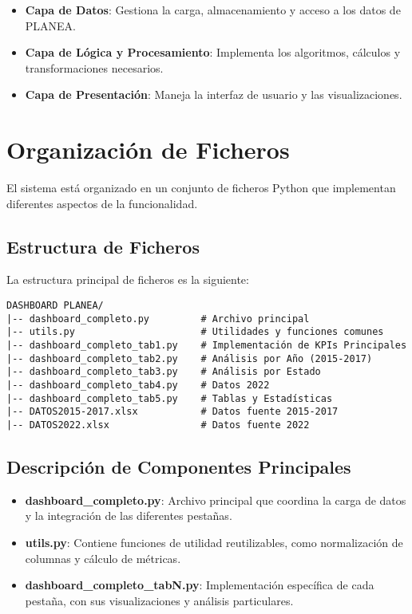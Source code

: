 \begin{itemize}
    \item \textbf{Capa de Datos}: Gestiona la carga, almacenamiento y acceso a los datos de PLANEA.
    \item \textbf{Capa de Lógica y Procesamiento}: Implementa los algoritmos, cálculos y transformaciones necesarios.
    \item \textbf{Capa de Presentación}: Maneja la interfaz de usuario y las visualizaciones.
\end{itemize}

\section{Organización de Ficheros}
El sistema está organizado en un conjunto de ficheros Python que implementan diferentes aspectos de la funcionalidad.

\subsection{Estructura de Ficheros}
La estructura principal de ficheros es la siguiente:

\begin{lstlisting}[caption=Estructura de ficheros del dashboard]
DASHBOARD PLANEA/
|-- dashboard_completo.py         # Archivo principal
|-- utils.py                      # Utilidades y funciones comunes
|-- dashboard_completo_tab1.py    # Implementación de KPIs Principales
|-- dashboard_completo_tab2.py    # Análisis por Año (2015-2017)
|-- dashboard_completo_tab3.py    # Análisis por Estado
|-- dashboard_completo_tab4.py    # Datos 2022
|-- dashboard_completo_tab5.py    # Tablas y Estadísticas
|-- DATOS2015-2017.xlsx           # Datos fuente 2015-2017
|-- DATOS2022.xlsx                # Datos fuente 2022
\end{lstlisting}

\subsection{Descripción de Componentes Principales}
\begin{itemize}
    \item \textbf{dashboard\_completo.py}: Archivo principal que coordina la carga de datos y la integración de las diferentes pestañas.
    \item \textbf{utils.py}: Contiene funciones de utilidad reutilizables, como normalización de columnas y cálculo de métricas.
    \item \textbf{dashboard\_completo\_tabN.py}: Implementación específica de cada pestaña, con sus visualizaciones y análisis particulares.
\end{itemize}

